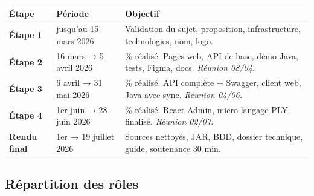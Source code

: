 \documentclass[12pt,a4paper]{article}
\begin{document}
\vspace{4pt}
\begin{center}
    \renewcommand{\arraystretch}{1.4}
    \begin{tabularx}{\linewidth}{>{\bfseries}l l >{\raggedright\arraybackslash}X}
        \textbf{Étape} & \textbf{Période}                                                           & \textbf{Objectif} \\
        \midrule
        \rowcolor{rowalt}
        \textbf{Étape 1}
                       & jusqu'au 15 mars 2026
                       & Validation du sujet, proposition, infrastructure, technologies, nom, logo.                     \\
        \textbf{Étape 2}
                       & 16 mars → 5 avril 2026
                       & 30\% réalisé. Pages web, API de base, démo Java, tests, Figma, docs.
        \textit{Réunion 08/04.}                                                                                         \\
        \rowcolor{rowalt}
        \textbf{Étape 3}
                       & 6 avril → 31 mai 2026
                       & 60\% réalisé. API complète + Swagger, client web, Java avec sync.
        \textit{Réunion 04/06.}                                                                                         \\
        \textbf{Étape 4}
                       & 1er juin → 28 juin 2026
                       & 95\% réalisé. React Admin, micro-langage PLY finalisé.
        \textit{Réunion 02/07.}                                                                                         \\
        \rowcolor{rowalt}
        \textbf{Rendu final}
                       & 1er → 19 juillet 2026
                       & Sources nettoyés, JAR, BDD, dossier technique, guide, soutenance 30 min.                       \\
    \end{tabularx}
\end{center}

\subsection{Répartition des rôles}
\end{document}
